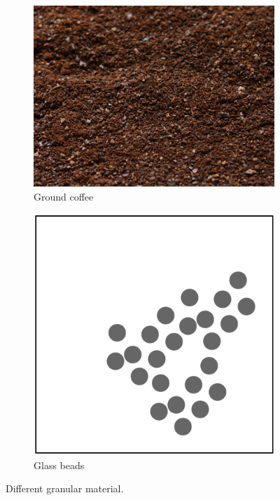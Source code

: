 \begin{figure}
\centering
\begin{subfigure}{.45\textwidth}
  \centering
  \includegraphics[width=\linewidth]{figures/jamming/coffee-grains}
  \caption{Ground coffee}
\end{subfigure}%
\hspace{0.5cm}
\begin{subfigure}{.45\textwidth}
  \centering
  \includegraphics[width=\linewidth]{figures/jamming/glass-beads}
  \caption{Glass beads}
\end{subfigure}
\caption{Different granular material.}
\label{fig:ch:jamming:particles-close-up}
\end{figure}

